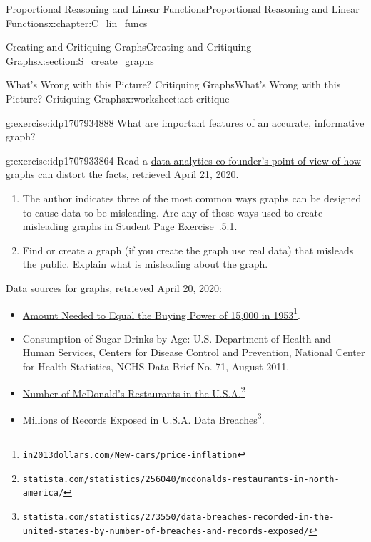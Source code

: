 \documentclass[oneside,10pt,]{book}
\newcommand{\xreffont}{\relax}
\numberwithin{equation}{chapter}
\begin{document}
\begin{chapterptx}{Proportional Reasoning and Linear Functions}{}{Proportional Reasoning and Linear Functions}{}{}{x:chapter:C_lin_funcs}
\begin{sectionptx}{Creating and Critiquing Graphs}{}{Creating and Critiquing Graphs}{}{}{x:section:S_create_graphs}
\begin{worksheet-subsection}{What's Wrong with this Picture? Critiquing Graphs}{}{What's Wrong with this Picture? Critiquing Graphs}{}{}{x:worksheet:act-critique}
\begin{divisionexercise}{3}{}{}{g:exercise:idp1707934888}%
What are important features of an accurate, informative graph?%
\end{divisionexercise}%
\begin{divisionexercise}{4}{}{}{g:exercise:idp1707933864}%
Read a \href{http://www.huffingtonpost.com/raviparikh/lie-with-data-visualization_b_5169715.html}{data analytics co-founder's point of view of how graphs can distort the facts}\footnotemark{}, retrieved April 21, 2020.%
\begin{enumerate}[font=\bfseries,label=(\alph*),ref=\alph*]
\item{}The author indicates three of the most common ways graphs can be designed to cause data to be misleading. Are any of these ways used to create misleading graphs in \hyperlink{x:exercise:exer-critique-1}{Student Page Exercise~{\xreffont 2.2.5.1}}.%
\item{}Find or create a graph (if you create the graph use real data) that misleads the public. Explain what is misleading about the graph.%
\end{enumerate}
\end{divisionexercise}%
%
\begin{conclusion}{}%
Data sources for graphs, retrieved April 20, 2020:%
\begin{itemize}[label=\textbullet]
\item{}\href{https://www.in2013dollars.com/New-cars/price-inflation}{Amount Needed to Equal the Buying Power of \textdollar{}15,000 in 1953}\footnote{\nolinkurl{in2013dollars.com/New-cars/price-inflation}\label{g:fn:idp1707931560}}.%
\item{}Consumption of Sugar Drinks by Age: U.S. Department of Health and Human Services, Centers for Disease Control and Prevention, National Center for Health Statistics, NCHS Data Brief No. 71, August 2011.%
\item{}\href{https://www.statista.com/statistics/256040/mcdonalds-restaurants-in-north-america/}{Number of McDonald's Restaurants in the U.S.A.}\footnote{\nolinkurl{statista.com/statistics/256040/mcdonalds-restaurants-in-north-america/}\label{g:fn:idp1707941672}}%
\item{}\href{https://www.statista.com/statistics/273550/data-breaches-recorded-in-the-united-states-by-number-of-breaches-and-records-exposed/}{Millions of Records Exposed in U.S.A. Data Breaches}\footnote{\nolinkurl{statista.com/statistics/273550/data-breaches-recorded-in-the-united-states-by-number-of-breaches-and-records-exposed/}\label{g:fn:idp1707937448}}.%

\end{itemize}
\end{conclusion}
\end{worksheet-subsection}
\end{sectionptx}
\end{chapterptx}
\end{document}

